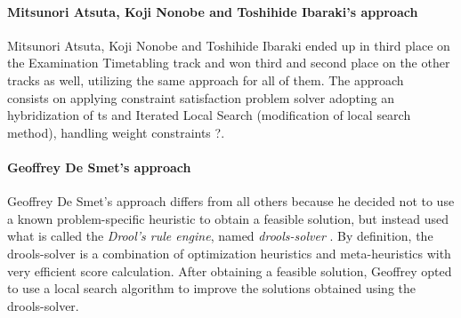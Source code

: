 

\paragraph{Mitsunori Atsuta, Koji Nonobe and Toshihide Ibaraki's approach}
Mitsunori Atsuta, Koji Nonobe and Toshihide Ibaraki ended up in third place on the Examination Timetabling track and won third and second place on the other tracks as well, utilizing the same approach for all of them. The approach~\cite{Atsuta2007} consists on applying constraint satisfaction problem solver adopting an hybridization of \gls{ts} and Iterated Local Search (modification of local search method), handling weight constraints {\color{red} ?}.\\

\paragraph{Geoffrey De Smet's approach}
Geoffrey De Smet's approach \cite{Smet2007} differs from all others because he decided not to use a known problem-specific heuristic to obtain a feasible solution, but instead used what is called the \textit{Drool's rule engine}, named \textit{drools-solver} \cite{Drools}. By definition, the drools-solver is a combination of optimization heuristics and meta-heuristics with very efficient score calculation. After obtaining a feasible solution, Geoffrey opted to use a local search algorithm to improve the solutions obtained using the drools-solver.\\

